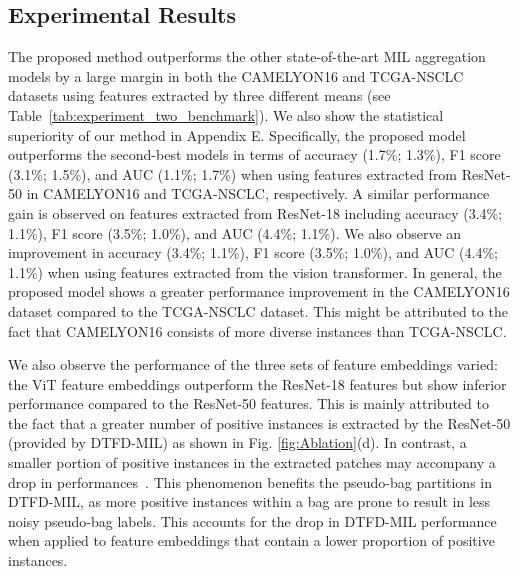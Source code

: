 \documentclass[runningheads]{llncs}
\begin{document}

\subsection{Experimental Results}
The proposed method outperforms the other state-of-the-art MIL aggregation models by a large margin in both the CAMELYON16 and TCGA-NSCLC datasets using features extracted by three different means (see Table~\ref{tab:experiment_two_benchmark}). We also show the statistical superiority of our method in Appendix E. Specifically, the proposed model outperforms the second-best models in terms of accuracy (1.7\%; 1.3\%), F1 score (3.1\%; 1.5\%), and AUC (1.1\%; 1.7\%) when using features extracted from ResNet-50 in CAMELYON16 and TCGA-NSCLC, respectively. 
A similar performance gain is observed on features extracted from ResNet-18 including accuracy (3.4\%; 1.1\%), F1 score (3.5\%; 1.0\%), and AUC (4.4\%; 1.1\%). We also observe an improvement in accuracy (3.4\%; 1.1\%), F1 score (3.5\%; 1.0\%), and AUC (4.4\%; 1.1\%) when using features extracted from the vision transformer. In general, the proposed model shows a greater performance improvement in the CAMELYON16 dataset compared to the TCGA-NSCLC dataset. This might be attributed to the fact that CAMELYON16 consists of more diverse instances than TCGA-NSCLC. 

We also observe the performance of the three sets of feature embeddings varied: the ViT feature embeddings outperform the ResNet-18 features but show inferior performance compared to the ResNet-50 features. This is mainly attributed to the fact that a greater number of positive instances is extracted by the ResNet-50 (provided by DTFD-MIL) as shown in Fig. \ref{fig:Ablation}(d). In contrast, a smaller portion of positive instances in the extracted patches may accompany a drop in performances~\cite{plp2}. This phenomenon benefits the pseudo-bag partitions in DTFD-MIL, as more positive instances within a bag are prone to result in less noisy pseudo-bag labels. This accounts for the drop in DTFD-MIL performance when applied to feature embeddings that contain a lower proportion of positive instances.
\end{document}
